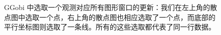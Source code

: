 \documentclass[
  b5paper,
  UTF8,twoside]{book}
\begin{document}
\begin{figure}

{\centering {}\newline{}

}

\caption[GGobi 中选取一个观测对应所有图形窗口的更新 ]{GGobi 中选取一个观测对应所有图形窗口的更新：我们在左上角的散点图中选取一个点，右上角的散点图也相应选取了一个点，而底部的平行坐标图则选取了一条线。所有的这些选取都代表了同一行数据。}\label{fig:GGobi-brush}
\end{figure}
\end{document}
